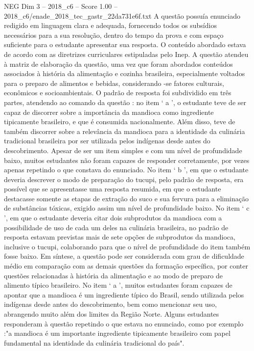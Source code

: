 \begin{textsample}{NEG Dim 3 – 2018\_c6 – Score 1.00 – 2018\_c6/enade\_2018\_tec\_gastr\_22da731e6f.txt}
A questão possuía enunciado redigido em linguagem clara e adequada, fornecendo todos os subsídios necessários para a sua resolução, dentro do tempo da prova e com espaço suficiente para o estudante apresentar sua resposta.
O conteúdo abordado estava de acordo com as diretrizes curriculares estipuladas pelo Inep.
A questão atendeu à matriz de elaboração da questão, uma vez que foram abordados conteúdos associados à história da alimentação e cozinha brasileira, especialmente voltados para o preparo de alimentos e bebidas, considerando -se fatores culturais, econômicos e socioambientais.
O padrão de resposta foi subdividido em três partes, atendendo ao comando da questão : no item ‘ a ’, o estudante teve de ser capaz de discorrer sobre a importância da mandioca como ingrediente tipicamente brasileiro, e que é consumida nacionalmente.
Além disso, teve de também discorrer sobre a relevância da mandioca para a identidade da culinária tradicional brasileira por ser utilizada pelos indígenas desde antes do descobrimento.
Apesar de ser um item simples e com um nível de profundidade baixo, muitos estudantes não foram capazes de responder corretamente, por vezes apenas repetindo o que constava do enunciado.
No item ‘ b ’, em que o estudante deveria descrever o modo de preparação do tucupi, pelo padrão de resposta, era possível que se apresentasse uma resposta resumida, em que o estudante destacasse somente as etapas de extração do suco e sua fervura para a eliminação de substâncias tóxicas, exigido assim um nível de profundidade baixo.
No item ‘ c ’, em que o estudante deveria citar dois subprodutos da mandioca com a possibilidade de uso de cada um deles na culinária brasileira, no padrão de resposta estavam previstas mais de sete opções de subprodutos da mandioca, inclusive o tucupi, colaborando para que o nível de profundidade do item também fosse baixo.
Em síntese, a questão pode ser considerada com grau de dificuldade médio em comparação com as demais questões da formação específica, por conter questões relacionadas à história da alimentação e ao modo de preparo de alimento típico brasileiro.
No item ‘ a ’, muitos estudantes foram capazes de apontar que a mandioca é um ingrediente típico do Brasil, sendo utilizada pelos indígenas desde antes do descobrimento, bem como mencionar seu uso, abrangendo muito além dos limites da Região Norte.
Alguns estudantes responderam à questão repetindo o que estava no enunciado, como por exemplo :"a mandioca é um importante ingrediente tipicamente brasileiro com papel fundamental na identidade da culinária tradicional do país".

\end{textsample}

